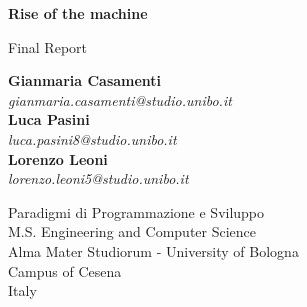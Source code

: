 
\begin{titlepage}
    \begin{center}
        \vspace*{1cm}

        \huge
        \textbf{Rise of the machine}

        \vspace{0.5cm}

        \Large
        Final Report

        \vspace{4cm}

        \large
        \textbf{Gianmaria Casamenti} \\
        \textit{gianmaria.casamenti@studio.unibo.it} \\
        \textbf{Luca Pasini} \\
        \textit{luca.pasini8@studio.unibo.it} \\
        \textbf{Lorenzo Leoni} \\
        \textit{lorenzo.leoni5@studio.unibo.it} \\

        \vspace{4cm}

        \Large
        Paradigmi di Programmazione e Sviluppo\\
        M.S. Engineering and Computer Science\\
        Alma Mater Studiorum - University of Bologna\\
        Campus of Cesena\\
        Italy\\

    \end{center}
\end{titlepage}